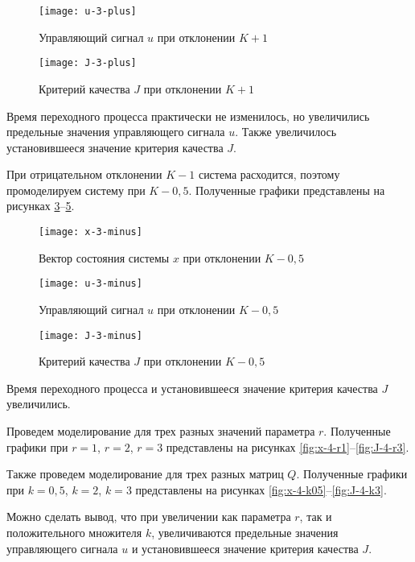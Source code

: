 \documentclass[14pt, a4paper]{extarticle}
\begin{document}
	\begin{figure}[H]
		\centering
		\texttt{[image: u-3-plus]}
		\caption{Управляющий сигнал $u$ при отклонении $K+1$}
		\label{fig:u-3-plus}
	\end{figure}
	
	\begin{figure}[H]
		\centering
		\texttt{[image: J-3-plus]}
		\caption{Критерий качества $J$ при отклонении $K+1$}
		\label{fig:J-3-plus}
	\end{figure}
	
	Время переходного процесса практически не изменилось, но увеличились предельные значения управляющего сигнала $u$. Также увеличилось установившееся значение критерия качества $J$.
	
	При отрицательном отклонении $K-1$ система расходится, поэтому промоделируем систему при $K-0,5$. Полученные графики представлены на рисунках \ref{fig:x-3-minus}--\ref{fig:J-3-minus}.

	\begin{figure}[H]
		\centering
		\texttt{[image: x-3-minus]}
		\caption{Вектор состояния системы $x$ при отклонении $K-0,5$}
		\label{fig:x-3-minus}
	\end{figure}
	
	\begin{figure}[H]
		\centering
		\texttt{[image: u-3-minus]}
		\caption{Управляющий сигнал $u$ при отклонении $K-0,5$}
		\label{fig:u-3-minus}
	\end{figure}
	
	\begin{figure}[H]
		\centering
		\texttt{[image: J-3-minus]}
		\caption{Критерий качества $J$ при отклонении $K-0,5$}
		\label{fig:J-3-minus}
	\end{figure}
	
	Время переходного процесса и установившееся значение критерия качества $J$ увеличились.
	
	Проведем моделирование для трех разных значений параметра $r$. Полученные графики при $r=1$, $r=2$, $r=3$ представлены на рисунках \ref{fig:x-4-r1}--\ref{fig:J-4-r3}.
	
	Также проведем моделирование для трех разных матриц $Q$. Полученные графики при $k=0,5$, $k=2$, $k=3$ представлены на рисунках \ref{fig:x-4-k05}--\ref{fig:J-4-k3}.
	
	Можно сделать вывод, что при увеличении как параметра $r$, так и  положительного множителя $k$, увеличиваются предельные значения управляющего сигнала $u$ и установившееся значение критерия качества $J$.
	
\end{document}
